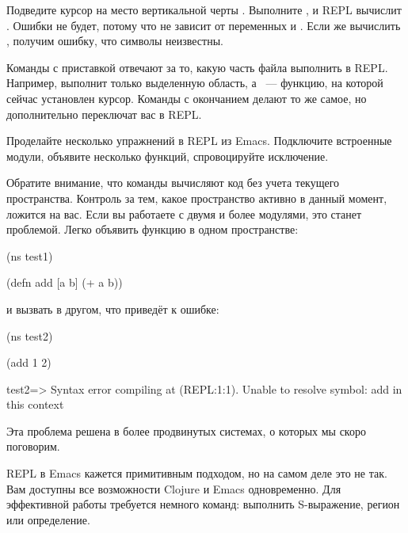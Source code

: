 Подведите курсор на место вертикальной черты . Выполните , и REPL вычислит . Ошибки не будет, потому что  не зависит от переменных  и . Если же вычислить , получим ошибку, что символы неизвестны.

Команды с приставкой  отвечают за то, какую часть файла выполнить в REPL. Например,  выполнит только выделенную область, а ~--- функцию, на которой сейчас установлен курсор. Команды с окончанием  делают то же самое, но дополнительно переключат вас в REPL.

Проделайте несколько упражнений в REPL из Emacs. Подключите встроенные модули, объявите несколько функций, спровоцируйте исключение.

Обратите внимание, что команды  вычисляют код без учета текущего пространства. Контроль за тем, какое пространство активно в данный момент, ложится на вас. Если вы работаете с двумя и более модулями, это станет проблемой. Легко объявить функцию в одном пространстве:

\begin{english}
  \begin{clojure}
(ns test1)

(defn add [a b]
  (+ a b))
  \end{clojure}
\end{english}

\noindent
и вызвать в другом, что приведёт к ошибке:

\begin{english}
  \begin{text}
(ns test2)

(add 1 2)

test2=> Syntax error compiling at (REPL:1:1).
Unable to resolve symbol: add in this context
  \end{text}
\end{english}

Эта проблема решена в более продвинутых системах, о которых мы скоро поговорим.

REPL в Emacs кажется примитивным подходом, но на самом деле это не так. Вам доступны все возможности Clojure и Emacs одновременно. Для эффективной работы требуется немного команд: выполнить S-выражение, регион или определение.

\def\urlbatsov{https://batsov.com/articles/2014/12/04/introducing-inf-clojure-a-better-basic-clojure-repl-for-emacs/}

